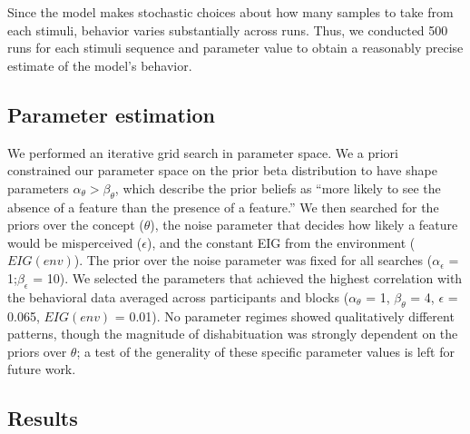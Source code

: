 \documentclass[10pt, letterpaper]{article}
\begin{document}
Since the model makes stochastic choices about how many samples to take
from each stimuli, behavior varies substantially across runs. Thus, we
conducted 500 runs for each stimuli sequence and parameter value to
obtain a reasonably precise estimate of the model's behavior.

\hypertarget{parameter-estimation}{%
\subsection{Parameter estimation}\label{parameter-estimation}}

We performed an iterative grid search in parameter space. We a priori
constrained our parameter space on the prior beta distribution to have
shape parameters \(\alpha_{\theta} > \beta_{\theta}\), which describe
the prior beliefs as ``more likely to see the absence of a feature than
the presence of a feature.'' We then searched for the priors over the
concept (\(\theta\)), the noise parameter that decides how likely a
feature would be misperceived (\(\epsilon\)), and the constant EIG from
the environment (\(EIG(env)\)). The prior over the noise parameter was
fixed for all searches (\(\alpha_{\epsilon}\) = 1;\(\beta_{\epsilon}\) =
10). We selected the parameters that achieved the highest correlation
with the behavioral data averaged across participants and blocks
(\(\alpha_{\theta}\) = 1, \(\beta_{\theta}\) = 4, \(\epsilon\) = 0.065,
\(EIG(env)\) = 0.01). No parameter regimes showed qualitatively
different patterns, though the magnitude of dishabituation was strongly
dependent on the priors over \(\theta\); a test of the generality of
these specific parameter values is left for future work.

\hypertarget{results-1}{%
\subsection{Results}\label{results-1}}
\end{document}
